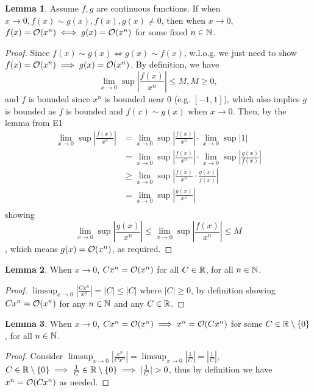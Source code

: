 \documentclass{homework}
\newcommand{\R}{\bb{R}} %
\newcommand{\N}{\bb{N}} %
\newcommand{\?}{\stackrel{?}{=}}
\theoremstyle{definition}
\newtheorem*{lemma}{Lemma}
\begin{document}
\begin{lemma}
    Assume $f,g$ are continuous functions. If when $x\to0, f(x)\sim g(x), f(x), g(x)\neq0$, then when $x\to0$, $f(x)=\cal{O}(x^n)\iff g(x)=\cal{O}(x^n)$ for some fixed $n\in\N$.

    \begin{proof}
        Since $f(x)\sim g(x)\iff g(x)\sim f(x)$, w.l.o.g. we just need to show $f(x)=\cal{O}(x^n)\implies g(x)=\cal{O}(x^n)$. By definition, we have \[\lim_{x\to0}\sup|\frac{f(x)}{x^n}|\leq M, M\geq0,\] and $f$ is bounded since $x^n$ is bounded near 0 (e.g. $[-1,1]$), which also implies $g$ is bounded as $f$ is bounded and $f(x)\sim g(x)$ when $x\to0$. Then, by the lemma from E1  \begin{align*}
            \lim_{x\to0}\sup|\frac{f(x)}{x^n}|&=\lim_{x\to0}\sup|\frac{f(x)}{x^n}|\cdot\lim_{x\to0}\sup|1|\\
            &=\lim_{x\to0}\sup|\frac{f(x)}{x^n}|\cdot\lim_{x\to0}\sup|\frac{g(x)}{f(x)}|\\
            &\geq \lim_{x\to0}\sup|\frac{f(x)}{x^n}\cdot\frac{g(x)}{f(x)}|\\
            &=\lim_{x\to0}\sup|\frac{g(x)}{x^n}|\\
        \end{align*}
        showing \[\lim_{x\to0}\sup|\frac{g(x)}{x^n}|\leq\lim_{x\to0}\sup|\frac{f(x)}{x^n}|\leq M\], which means $g(x)=\cal{O}(x^n)$, as required.
    \end{proof}
\end{lemma}

\begin{lemma}
    When $x\to0$, $Cx^n=\cal{O}(x^n)$ for all $C\in\R$, for all $n\in\N$. 

    \begin{proof}
        $\limsup_{x\to0}|\frac{Cx^n}{x^n}|=|C|\leq |C|$ where $|C|\geq0$, by definition showing $Cx^n=\cal{O}(x^n)$ for any $n\in\N$ and any $C\in\R$.
    \end{proof}
\end{lemma}

\begin{lemma}
    When $x\to0$, $Cx^n=\cal{O}(x^n)\implies x^n=\cal{O}(Cx^n)$ for some $C\in\R\setminus\{0\}$, for all $n\in\N$. 

    \begin{proof}
        Consider $\limsup_{x\to0}|\frac{x^n}{Cx^n}|=\limsup_{x\to0}|\frac{1}{C}|=|\frac1C|$, $C\in\R\setminus\{0\}\implies\frac1C\in\R\setminus\{0\}\implies |\frac1C|>0$, thus by definition we have $x^n=\cal{O}(Cx^n)$ as needed. 
    \end{proof}
\end{lemma}
\end{document}

